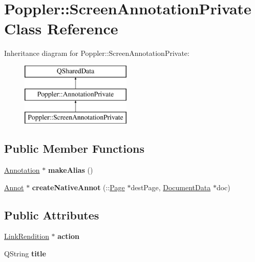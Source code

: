 \hypertarget{class_poppler_1_1_screen_annotation_private}{}\section{Poppler\+:\+:Screen\+Annotation\+Private Class Reference}
\label{class_poppler_1_1_screen_annotation_private}
Inheritance diagram for Poppler\+:\+:Screen\+Annotation\+Private\+:\begin{figure}[H]
\begin{center}
\leavevmode
\includegraphics[height=3.000000cm]{class_poppler_1_1_screen_annotation_private}
\end{center}
\end{figure}
\subsection*{Public Member Functions}
\begin{DoxyCompactItemize}
\item 
\mbox{\label{class_poppler_1_1_screen_annotation_private_a53209a0570db01c9a5e6daa930d86f24}} 
\hyperlink{class_poppler_1_1_annotation}{Annotation} $\ast$ {\bfseries make\+Alias} ()
\item 
\mbox{\label{class_poppler_1_1_screen_annotation_private_a97330433b427b4191d0d9d57822cc8f3}} 
\hyperlink{class_annot}{Annot} $\ast$ {\bfseries create\+Native\+Annot} (\+::\hyperlink{class_poppler_1_1_page}{Page} $\ast$dest\+Page, \hyperlink{class_poppler_1_1_document_data}{Document\+Data} $\ast$doc)
\end{DoxyCompactItemize}
\subsection*{Public Attributes}
\begin{DoxyCompactItemize}
\item 
\mbox{\label{class_poppler_1_1_screen_annotation_private_a646cfab1a9c0745269bfe891f690de77}} 
\hyperlink{class_poppler_1_1_link_rendition}{Link\+Rendition} $\ast$ {\bfseries action}
\item 
\mbox{\label{class_poppler_1_1_screen_annotation_private_a7283cc0afd2dee76237a3b03a63de986}} 
Q\+String {\bfseries title}
\end{DoxyCompactItemize}
